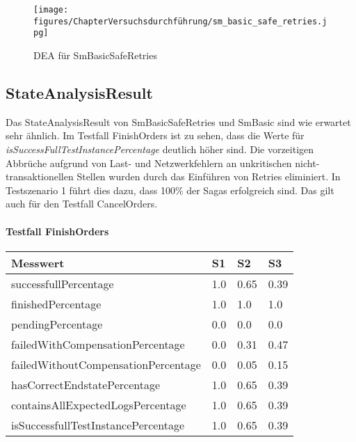 \begin{figure}[h!]
	\centering
	\texttt{[image: figures/ChapterVersuchsdurchführung/sm\_basic\_safe\_retries.jpg]}
	\caption{DEA für SmBasicSafeRetries}
	\label{fig:SmBasicSafeRetries}
\end{figure}
\FloatBarrier

\subsection{StateAnalysisResult}

Das StateAnalysisResult von SmBasicSafeRetries und SmBasic sind wie erwartet sehr ähnlich. Im Testfall FinishOrders ist zu sehen, dass die Werte für \textit{isSuccessFullTestInstancePercentage} deutlich höher sind. Die vorzeitigen Abbrüche aufgrund von Last- und Netzwerkfehlern an unkritischen nicht-transaktionellen Stellen wurden durch das Einführen von Retries eliminiert. In Testszenario 1 führt dies dazu, dass 100\% der Sagas erfolgreich sind. Das gilt auch für den Testfall CancelOrders.

\paragraph*{Testfall FinishOrders}
\begin{center}
	\fontsize{9}{12}\selectfont
	\begin{longtable}[h]{|p{5cm}|p{1cm}|p{1cm}|p{1cm}|}
		\hline
		Messwert & S1 & S2 & S3 \\ \hline
		\endhead
		\endfoot
		successfull\-Percentage & 1.0 & 0.65 & 0.39 \\ \hline
		finished\-Percentage & 1.0 & 1.0 & 1.0 \\ \hline
		pending\-Percentage & 0.0 & 0.0 & 0.0 \\ \hline
		failedWithCompensation\-Percentage & 0.0 & 0.31 & 0.47 \\ \hline
		failedWithoutCompensation\-Percentage & 0.0 & 0.05 & 0.15 \\ \hline
		hasCorrectEndstate\-Percentage & 1.0 & 0.65 & 0.39 \\ \hline
		containsAllExpectedLogs\-Percentage & 1.0 & 0.65 & 0.39 \\ \hline
		isSuccessfullTestInstance\-Percentage & 1.0 & 0.65 & 0.39 \\ \hline
	\end{longtable}
\end{center}
\FloatBarrier

